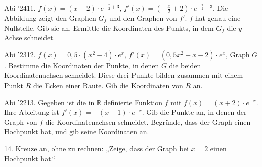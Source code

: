 \documentclass[11pt]{article}
\begin{document}
\pfgruppe{}
\begin{pfaufg}{Abi ’24}{11.}{}
$f(x) = (x - 2)\cdot e^{-\tfrac{x}{2} + 3}$, $f'(x) = \left(-\tfrac{x}{2} + 2\right)\cdot e^{-\tfrac{x}{2} + 3}$. Die Abbildung zeigt den Graphen $G_f$ und den Graphen von $f'$. $f$ hat genau eine Nullstelle. Gib sie an. Ermittle die Koordinaten des Punkts, in dem $G_f$ die $y$-Achse schneidet.
\par\smallskip\noindent {}\par
{}
\end{pfaufg}
\pfgruppe{}
\begin{pfaufg}{Abi ’23}{12.}{}
$f(x) = 0{,}5\cdot(x^2 - 4)\cdot e^x$, $f'(x) = (0{,}5x^2 + x - 2)\cdot e^x$, Graph $G$. Bestimme die Koordinaten der Punkte, in denen $G$ die beiden Koordinatenachsen schneidet. Diese drei Punkte bilden zusammen mit einem Punkt $R$ die Ecken einer Raute. Gib die Koordinaten von $R$ an.
\end{pfaufg}
\pfgruppe{}
\begin{pfaufg}{Abi ’22}{13.}{}
Gegeben ist die in $\mathbb{R}$ definierte Funktion $f$ mit $f(x) = (x + 2)\cdot e^{-x}$. Ihre Ableitung ist $f'(x) = -(x + 1)\cdot e^{-x}$. Gib die Punkte an, in denen der Graph von $f$ die Koordinatenachsen schneidet. Begründe, dass der Graph einen Hochpunkt hat, und gib seine Koordinaten an.
\end{pfaufg}
\begin{pfaufg}{}{14.}{}
Kreuze an, ohne zu rechnen: „Zeige, dass der Graph bei $x = 2$ einen Hochpunkt hat.“ 
\end{pfaufg}
\end{document}
